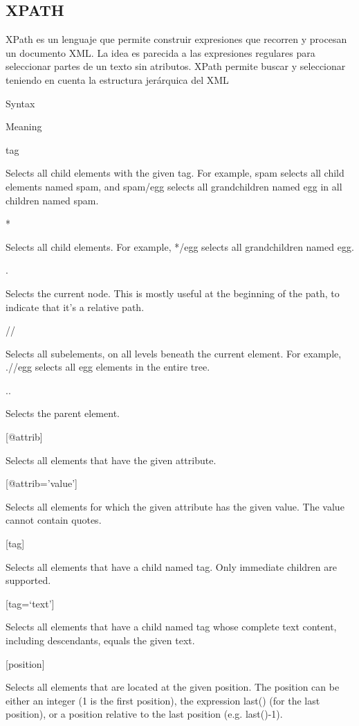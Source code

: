 \documentclass[11pt]{article}
\begin{document}
    \hypertarget{xpath}{%
\subsection{XPATH}\label{xpath}}

    XPath es un lenguaje que permite construir expresiones que recorren y
procesan un documento XML. La idea es parecida a las expresiones
regulares para seleccionar partes de un texto sin atributos. XPath
permite buscar y seleccionar teniendo en cuenta la estructura jerárquica
del XML

    Syntax

Meaning

{tag}

Selects all child elements with the given tag. For example, {spam}
selects all child elements named {spam}, and {spam/egg} selects all
grandchildren named {egg} in all children named {spam}.

*

Selects all child elements. For example, */egg selects all grandchildren
named {egg}.

{.}

Selects the current node. This is mostly useful at the beginning of the
path, to indicate that it's a relative path.

{//}

Selects all subelements, on all levels beneath the current element. For
example, {.//egg} selects all {egg} elements in the entire tree.

{..}

Selects the parent element.

{{[}@attrib{]}}

Selects all elements that have the given attribute.

{{[}@attrib='value'{]}}

Selects all elements for which the given attribute has the given value.
The value cannot contain quotes.

{{[}tag{]}}

Selects all elements that have a child named {tag}. Only immediate
children are supported.

{{[}tag=`text'{]}}

Selects all elements that have a child named {tag} whose complete text
content, including descendants, equals the given {text}.

{{[}position{]}}

Selects all elements that are located at the given position. The
position can be either an integer (1 is the first position), the
expression {last()} (for the last position), or a position relative to
the last position (e.g. {last()-1}).
\end{document}
